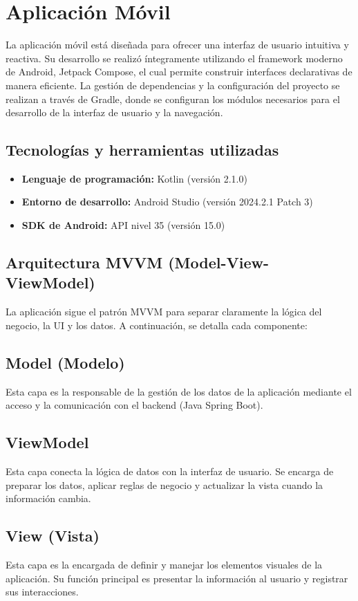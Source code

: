 \section{Aplicación Móvil}

La aplicación móvil está diseñada para ofrecer una interfaz de usuario intuitiva y reactiva. Su desarrollo se realizó íntegramente utilizando el framework moderno de Android, Jetpack Compose, el cual permite construir interfaces declarativas de manera eficiente. La gestión de dependencias y la configuración del proyecto se realizan a través de Gradle, donde se configuran los módulos necesarios para el desarrollo de la interfaz de usuario y la navegación.

\subsection{Tecnologías y herramientas utilizadas}
\begin{itemize}
	\item \textbf {Lenguaje de programación:} Kotlin (versión 2.1.0)
	\item \textbf {Entorno de desarrollo:} Android Studio (versión 2024.2.1 Patch 3)
	\item \textbf {SDK de Android:} API nivel 35 (versión 15.0)
\end{itemize}

\subsection{Arquitectura MVVM (Model-View-ViewModel)}
La aplicación sigue el patrón MVVM para separar claramente la lógica del negocio, la UI y los datos. A continuación, se detalla cada componente: 

\subsection*{Model (Modelo)}
Esta capa es la responsable de la gestión de los datos de la aplicación mediante el acceso y la comunicación con el backend (Java Spring Boot).
\subsection*{ViewModel}
Esta capa conecta la lógica de datos con la interfaz de usuario. Se encarga de preparar los datos, aplicar reglas de negocio y actualizar la vista cuando la información cambia.
\subsection*{View (Vista)}
Esta capa es la encargada de definir y manejar los elementos visuales de la aplicación. Su función principal es presentar la información al usuario y registrar sus interacciones.

